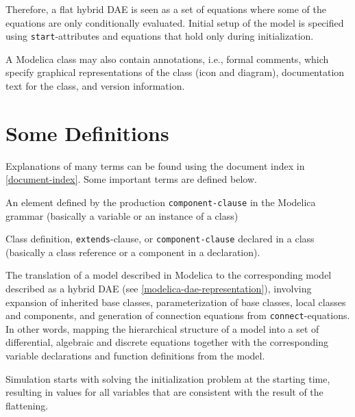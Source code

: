Therefore, a flat hybrid DAE is seen as a set of equations where some of the equations are only conditionally evaluated.
Initial setup of the model is specified using \lstinline!start!-attributes and equations that hold only during initialization.

A Modelica class may also contain annotations, i.e., formal comments, which specify graphical representations of the class (icon and diagram), documentation text for the class, and version information.

\section{Some Definitions}\label{some-definitions}

Explanations of many terms can be found using the document index in \cref{document-index}.
Some important terms are defined below.

\begin{definition}[Component]
An element defined by the production \lstinline[language=grammar]!component-clause! in the Modelica grammar (basically a variable or an instance of a class)
\end{definition}

\begin{definition}[Element]
Class definition, \lstinline!extends!-clause, or \lstinline[language=grammar]!component-clause! declared in a class (basically a class reference or a component in a declaration).
\end{definition}

\begin{definition}[Flattening]
The translation of a model described in Modelica to the corresponding model described as a hybrid DAE (see \cref{modelica-dae-representation}), involving expansion of inherited base classes, parameterization of base classes, local classes and components, and generation of connection equations from \lstinline!connect!-equations.
In other words, mapping the hierarchical structure of a model into a set of differential, algebraic and discrete equations together with the corresponding variable declarations and function definitions from the model.
\end{definition}

\begin{definition}[Initialization]
Simulation starts with solving the initialization problem at the starting time, resulting in values for all variables that are consistent with the result of the flattening.
\end{definition}

